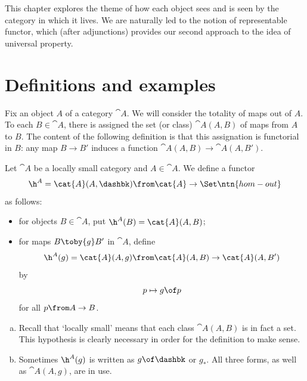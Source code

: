 This chapter explores the theme of how each object sees and is seen by the
category in which it lives.  We are naturally led to the notion of
representable functor, which (after adjunctions) provides our second
approach to the idea of universal property.



\section{Definitions and examples}
\label{sec:rep-defns}


Fix an object $A$ of a category $\cat{A}$.  We will consider the totality
of maps out of $A$.  To each $B \in \cat{A}$, there is assigned the set
(or class) $\cat{A}(A, B)$ of maps from $A$ to $B$.  The content of the
following definition is that this assignation is functorial in $B$: any map
$B \to B'$ induces a function $\cat{A}(A, B) \to \cat{A}(A, B')$.

\begin{defn}  
\label{defn:co-rep}
Let $\cat{A}$ be a locally small category and $A \in \cat{A}$.  We define a
functor
\[
\h^A = \cat{A}(A, \dashbk)\from \cat{A} \to \Set%
%
\ntn{hom-out}
%
\]
as follows:
% 
\begin{itemize}
\item 
for objects $B \in \cat{A}$, put $\h^A(B) = \cat{A}(A, B)$;

\item 
for maps $B \toby{g} B'$ in $\cat{A}$, define
\[
\h^A(g) = \cat{A}(A, g)\from 
\cat{A}(A, B) \to \cat{A}(A, B')
\]
by 
\[
p 
\mapsto
g \of p
\]
for all $p\from A \to B$.
\end{itemize}
\end{defn}

\begin{remarks}
\begin{enumerate}[(b)]
\item 
Recall that `locally%
%
%
%
small' means that each class $\cat{A}(A, B)$ is in fact a set.  This
hypothesis is clearly necessary in order for the definition to make sense.

\item 
Sometimes $\h^A(g)$ is written as $g \of \dashbk$%
%
%
 or $g_*$.%
%
%
All three forms, as well as $\cat{A}(A, g)$, are in use.
\end{enumerate}
\end{remarks}

